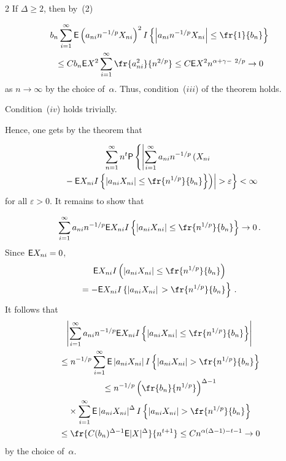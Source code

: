 \begin{multicols}{2}
If $ \Delta\ge 2$, then by~(2)

\noindent
\begin{multline*}
b_n \sum\limits_{i=1}^\infty {\sf E}\left(a_{ni}n^{-1/p} X_{ni}\right)^2 I
\left\{\left|a_{ni}n^{-1/p} X_{ni}\right|\le\fr{1}{b_n}\right\} \\
{}\le  C b_n {\sf E} X^2 \sum\limits_{i=1}^\infty \fr{a_{ni}^2}{n^{2/p}} 
\le C {\sf E} X^2 n^{\alpha +\gamma- \ 2/p} \to 0
\end{multline*}
as $n\to \infty$
by the choice of~$\alpha$. Thus, condition~($iii$) of the theorem holds.

Condition~($iv$) holds trivially.

Hence, one gets by the theorem that

\noindent
\begin{multline*}
\sum\limits_{n=1}^\infty n^t {\sf P}\left\{ \left|\sum\limits_{i=1}^\infty a_{ni}n^{-1/p} 
\left(X_{ni}\right.\right.\right.\\
\left.\left.\left.{}- {\sf E}X_{ni}I\left\{\left|a_{ni}X_{ni}\right|\le
\fr{n^{1/p}}{b_n}\right\}\right)\right|> \varepsilon \right\}<\infty
\end{multline*}
for all $\varepsilon>0$.
It remains to show that

\noindent
$$ 
\sum\limits_{i=1}^\infty a_{ni}n^{-1/p}  {\sf E}X_{ni}I
\left\{\left|a_{ni}X_{ni}\right|\le \fr{n^{1/p}}{b_n}\right\}\to 0\,. 
$$
Since ${\sf E}X_{ni}=0$,
\begin{multline*}
 {\sf E}X_{ni}I\left(|a_{ni}X_{ni}|\le \fr{n^{1/p}}{b_n}\right)\\=
-{\sf E}X_{ni}I\left\{|a_{ni}X_{ni}|\right.
\left.
>\fr{n^{1/p}}{b_n}\right\}\,.
\end{multline*}
It follows that
\begin{multline*}
\left|\sum\limits_{i=1}^\infty a_{ni}n^{-1/p} {\sf E}
X_{ni}I\left\{\left|a_{ni}X_{ni}\right|\le \fr{n^{1/p}}{b_n}\right\}\right|\\
{}\le n^{-1/p} \sum\limits_{i=1}^\infty   {\sf E}\left|a_{ni}X_{ni}\right| I
\left\{\left|a_{ni}X_{ni}\right|> \fr{n^{1/p}}{b_n}\right\}\\
{}\le n^{-1/p} \left(\fr{b_n}{n^{1/p}}\right)^{\Delta-1}\\
{}\times \sum\limits_{i=1}^\infty  
{\sf E}\left|a_{ni}X_{ni}\right|^{\Delta} I\left\{\left|a_{ni}X_{ni}\right|>
\fr{n^{1/p}}{b_n}\right\}\\
{}\le \fr{C  (b_n)^{\Delta-1} {\sf E}|X|^{\Delta}}{n^{t+1}} \le C n^{\alpha(\Delta-1)-t-1} \to 0
\end{multline*}
by the choice of~$\alpha$.


\end{multicols}
